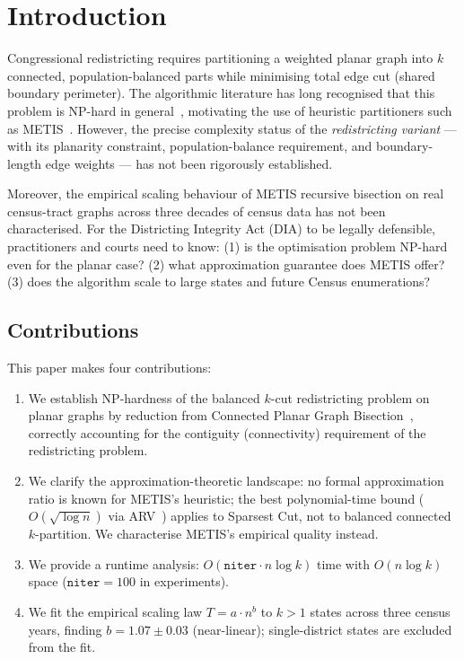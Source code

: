 \section{Introduction}
\label{sec:intro}

Congressional redistricting requires partitioning a weighted planar graph
into $k$ connected, population-balanced parts while minimising total edge
cut (shared boundary perimeter).
The algorithmic literature has long recognised that this problem is NP-hard
in general~\citep{garey1979computers,garey1976simplified}, motivating the
use of heuristic partitioners such as METIS~\citep{karypis1998}.
However, the precise complexity status of the \emph{redistricting variant}
--- with its planarity constraint, population-balance requirement, and
boundary-length edge weights --- has not been rigorously established.

Moreover, the empirical scaling behaviour of METIS recursive bisection on
real census-tract graphs across three decades of census data has not been
characterised.  For the Districting Integrity Act (DIA) to be legally
defensible, practitioners and courts need to know: (1) is the optimisation
problem NP-hard even for the planar case? (2) what approximation guarantee
does METIS offer? (3) does the algorithm scale to large states and future
Census enumerations?

\subsection*{Contributions}

This paper makes four contributions:

\begin{enumerate}
  \item We establish NP-hardness of the balanced $k$-cut redistricting
    problem on planar graphs by reduction from Connected Planar Graph
    Bisection~\citep{dyer1985partitioning}, correctly accounting for the
    contiguity (connectivity) requirement of the redistricting problem.
  \item We clarify the approximation-theoretic landscape: no formal
    approximation ratio is known for METIS's heuristic; the best
    polynomial-time bound ($O(\sqrt{\log n})$ via ARV~\citep{arora2009expander})
    applies to Sparsest Cut, not to balanced connected $k$-partition.
    We characterise METIS's empirical quality instead.
  \item We provide a runtime analysis: $O(\texttt{niter} \cdot n \log k)$
    time with $O(n \log k)$ space ($\texttt{niter} = 100$ in experiments).
  \item We fit the empirical scaling law $T = a \cdot n^b$ to $k > 1$
    states across three census years, finding $b = 1.07 \pm 0.03$
    (near-linear); single-district states are excluded from the fit.
\end{enumerate}

